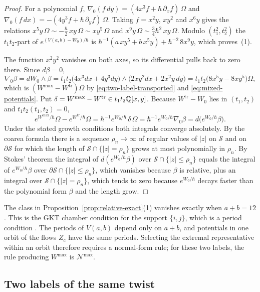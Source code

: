 \begin{proof}
For a polynomial $f$, $\nabla_0(f\,dy)=(4x^3f+\hbar\,\partial_xf)\,\Omega$ and
$\nabla_0(f\,dx)=-(4y^3f+\hbar\,\partial_yf)\,\Omega$.  Taking $f=x^2y$, $xy^2$
and $x^6y$ gives the relations
$x^5y\,\Omega\sim-\tfrac\hbar2\,xy\,\Omega\sim xy^5\,\Omega$ and
$x^9y\,\Omega\sim\tfrac34\hbar^2\,xy\,\Omega$.  Modulo $(t_1^2,t_2^2)$ the
$t_1t_2$-part of $e^{(V(a,b)-W_0)/\hbar}$ is
$\hbar^{-1}(a\,xy^5+b\,x^5y)+\hbar^{-2}\,8x^9y$, which proves~(1).

The function $x^2y^2$ vanishes on both axes, so its differential pulls back
to zero there.  Since $d\beta=0$,
\[
 \nabla_0\beta=dW_0\wedge\beta
 =t_1t_2\bigl(4x^3dx+4y^3dy\bigr)\wedge\bigl(2xy^2dx+2x^2y\,dy\bigr)
 =t_1t_2\bigl(8x^5y-8xy^5\bigr)\Omega,
\]
which is $(W^{\max}-W^{\mathrm{tr}})\Omega$ by
\eqref{eq:two-label-transported} and \eqref{eq:mixed-potentials}.  Put
$\delta=W^{\max}-W^{\mathrm{tr}}\in t_1t_2\mathbb Q[x,y]$.  Because
$W^{\mathrm{tr}}-W_0$ lies in $(t_1,t_2)$ and $t_1t_2(t_1,t_2)=0$,
\[
 e^{W^{\max}/\hbar}\Omega-e^{W^{\mathrm{tr}}/\hbar}\Omega
 =\hbar^{-1}e^{W_0/\hbar}\,\delta\,\Omega
 =\hbar^{-1}e^{W_0/\hbar}\nabla_0\beta
 =d\bigl(e^{W_0/\hbar}\beta\bigr).
\]
Under the stated growth conditions both integrals converge absolutely.  By
the coarea formula there is a sequence $\rho_n\to\infty$ of regular values of
$|z|$ on $\mathcal S$ and on $\partial\mathcal S$ for which the length of
$\mathcal S\cap\{|z|=\rho_n\}$ grows at most polynomially in $\rho_n$.  By
Stokes' theorem the integral of $d(e^{W_0/\hbar}\beta)$ over
$\mathcal S\cap\{|z|\le\rho_n\}$ equals the integral of
$e^{W_0/\hbar}\beta$ over $\partial\mathcal S\cap\{|z|\le\rho_n\}$, which
vanishes because $\beta$ is relative, plus an integral over
$\mathcal S\cap\{|z|=\rho_n\}$, which tends to zero because
$e^{W_0/\hbar}$ decays faster than the polynomial form $\beta$ and the length
grow.
\end{proof}

The class in Proposition~\ref{prop:relative-exact}(1) vanishes exactly when
$a+b=12$.  This is the GKT chamber condition for the support $\{i,j\}$,
which is a period condition \cite[Def.~3.47(3) and Thm.~4.9]{grossetal2022open}.
The periods of $V(a,b)$ depend only on $a+b$, and potentials in one orbit of
the flows $Z_c$ have the same periods.  Selecting the extremal representative within an
orbit therefore requires a normal-form rule; for these two labels, the rule
producing $W^{\max}$ is $\mathcal N^{\max}$.

\subsection{Two labels of the same twist}

